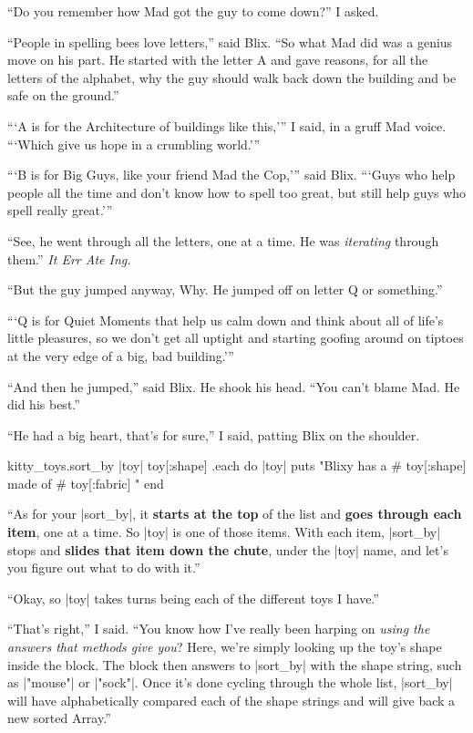 \documentclass[12pt,twoside]{report}
\begin{document}
``Do you remember how Mad got the guy to come down?'' I asked.

``People in spelling bees love letters,'' said Blix.  ``So what Mad
did was a genius move on his part. He started with the letter A and
gave reasons, for all the letters of the alphabet, why the guy should
walk back down the building and be safe on the ground.''

```A is for the Architecture of buildings like this,''' I said, in a
gruff Mad voice. ```Which give us hope in a crumbling world.'''

```B is for Big Guys, like your friend Mad the Cop,''' said Blix.
```Guys who help people all the time and don't know how to spell too
great, but still help guys who spell really great.'''

``See, he went through all the letters, one at a time.  He was {\em
  iterating} through them.'' {\em It Err Ate Ing.}

``But the guy jumped anyway, Why.  He jumped off on letter Q or
something.''

```Q is for Quiet Moments that help us calm down and think about all
of life's little pleasures, so we don't get all uptight and starting
goofing around on tiptoes at the very edge of a big, bad building.'''

``And then he jumped,'' said Blix.  He shook his head.  ``You can't
blame Mad.  He did his best.''

``He had a big heart, that's for sure,'' I said, patting Blix on the
shoulder.


\begin{rubycode}

 kitty_toys.sort_by { |toy| toy[:shape] }.each do |toy|
   puts "Blixy has a #{ toy[:shape] } made of #{ toy[:fabric] }"
 end

\end{rubycode}

``As for your \rubyinline|sort_by|, it {\bf starts at
  the top} of the list and {\bf goes through each item}, one at a
time. So \rubyinline|toy| is one of those items.  With
each item, \rubyinline|sort_by| stops and {\bf slides
  that item down the chute}, under the
\rubyinline|toy| name, and let's you figure out what
to do with it.''

``Okay, so \rubyinline|toy| takes turns being each of
the different toys I have.''

``That's right,'' I said.  ``You know how I've really been harping on
{\em using the answers that methods give you}?  Here, we're simply
looking up the toy's shape inside the block.  The block then answers
to \rubyinline|sort_by| with the shape string, such as
\rubyinline|"mouse"| or
\rubyinline|"sock"|.  Once it's done cycling through
the whole list, \rubyinline|sort_by| will have
alphabetically compared each of the shape strings and will give back a
new sorted Array.''
\end{document}
